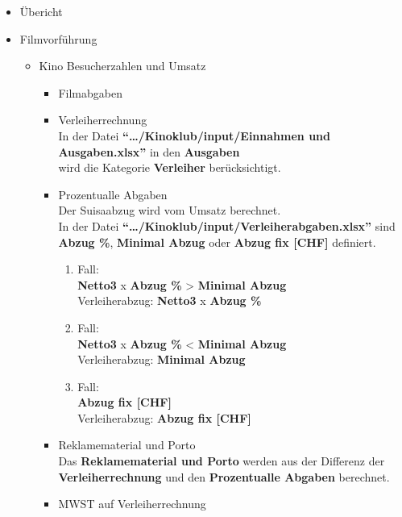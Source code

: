 \documentclass[
]{article}
\providecommand{\tightlist}{%
  \setlength{\itemsep}{0pt}\setlength{\parskip}{0pt}}
\begin{document}
\begin{itemize}
\tightlist
\item
  Übericht\\
\item
  Filmvorführung

  \begin{itemize}
  \tightlist
  \item
    Kino Besucherzahlen und Umsatz

    \begin{itemize}
    \item
      Filmabgaben\\
    \item
      Verleiherrechnung\\
      In der Datei \textbf{``\ldots/Kinoklub/input/Einnahmen und
      Ausgaben.xlsx''} in den \textbf{Ausgaben}\\
      wird die Kategorie \textbf{Verleiher} berücksichtigt.
    \item
      Prozentualle Abgaben\\
      Der Suisaabzug wird vom Umsatz berechnet.\\

      In der Datei
      \textbf{``\ldots/Kinoklub/input/Verleiherabgaben.xlsx''} sind
      \textbf{Abzug \%}, \textbf{Minimal Abzug} oder \textbf{Abzug fix
      {[}CHF{]}} definiert.\\

      \begin{enumerate}
      \def\labelenumi{\arabic{enumi}.}
      \tightlist
      \item
        Fall:\\
        \textbf{Netto3} x \textbf{Abzug \%} \textgreater{}
        \textbf{Minimal Abzug}\\
        Verleiherabzug: \textbf{Netto3} x \textbf{Abzug \%}
      \item
        Fall:\\
        \textbf{Netto3} x \textbf{Abzug \%} \textless{} \textbf{Minimal
        Abzug}\\
        Verleiherabzug: \textbf{Minimal Abzug}\\
      \item
        Fall:\\
        \textbf{Abzug fix {[}CHF{]}}\\
        Verleiherabzug: \textbf{Abzug fix {[}CHF{]}}
      \end{enumerate}
    \item
      Reklamematerial und Porto\\
      Das \textbf{Reklamematerial und Porto} werden aus der Differenz
      der \textbf{Verleiherrechnung} und den \textbf{Prozentualle
      Abgaben} berechnet.
    \item
      MWST auf Verleiherrechnung\\


\end{itemize}
\end{itemize}
\end{itemize}
\end{document}
